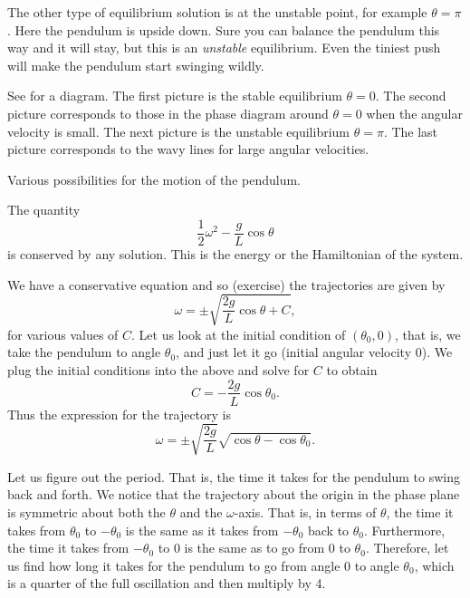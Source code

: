 The other type of equilibrium solution is at the unstable point, for example
$\theta = \pi$.  Here the pendulum is upside down.  Sure you can balance the
pendulum this way and it will stay, but this is an \emph{unstable} equilibrium.
Even the tiniest push will make the pendulum start swinging wildly.

See  for a diagram.  The first picture is the
stable equilibrium $\theta = 0$.  The second picture corresponds to those
 in the phase diagram around $\theta =0$ when the angular
velocity is small.  The next picture is the unstable equilibrium $\theta =
\pi$.  The last picture corresponds to the wavy lines for large angular
velocities.

\begin{myfig}
\capstart
{}
\caption{Various possibilities for the motion of the pendulum. \label{fig:nlin-pend}}
\end{myfig}

The quantity 
\begin{equation*}
\frac{1}{2} \omega^2  - \frac{g}{L} \cos \theta 
\end{equation*}
is conserved by any solution.  This is the energy or the Hamiltonian of
the system.

We have a conservative equation and so (exercise) the
trajectories are given by
\begin{equation*}
\omega = \pm \sqrt{ \frac{2g}{L} \cos \theta + C} ,
\end{equation*}
for various values of $C$.  
Let us look at the initial condition of $(\theta_0,0)$,
that is, we take the pendulum to
angle $\theta_0$, and just let it go (initial angular velocity 0).
We plug the initial conditions into the above and solve for $C$ to obtain
\begin{equation*}
C = - \frac{2g}{L} \cos \theta_0 .
\end{equation*}
Thus the expression for the trajectory is
\begin{equation*}
\omega = \pm \sqrt{ \frac{2g}{L}} \sqrt{ \cos \theta - \cos \theta_0 } .
\end{equation*}

Let us figure out the period.  That is, the time it takes for the pendulum
to swing back and forth.
We notice that the trajectory about the
origin in the phase plane is symmetric about both the $\theta$ and the
$\omega$-axis.  That is, in terms of $\theta$,
the time it takes from $\theta_0$ to $-\theta_0$
is the same as it takes from $-\theta_0$ back to $\theta_0$.  Furthermore,
the time it takes from $-\theta_0$ to $0$ is the same as to go from $0$ to
$\theta_0$.  Therefore, let us find how long it takes for
the pendulum to go from angle 0 to angle $\theta_0$, which is a quarter of
the full oscillation and then multiply by 4.

